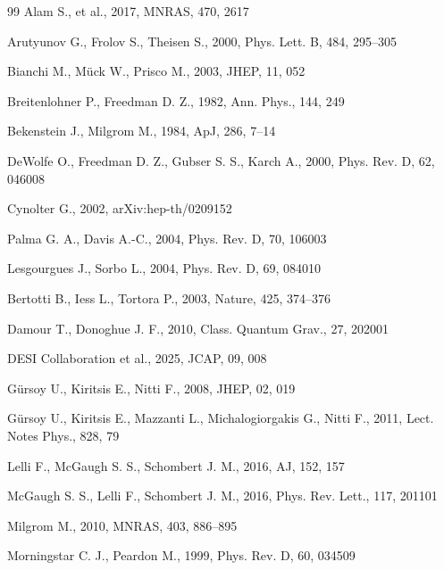 \documentclass[10pt]{article}
\begin{document}
\begin{thebibliography}{99}
Alam S., et al., 2017, MNRAS, 470, 2617

Arutyunov G., Frolov S., Theisen S., 2000, Phys. Lett. B, 484, 295--305

Bianchi M., M\"uck W., Prisco M., 2003, JHEP, 11, 052

Breitenlohner P., Freedman D. Z., 1982, Ann. Phys., 144, 249

Bekenstein J., Milgrom M., 1984, ApJ, 286, 7--14

DeWolfe O., Freedman D. Z., Gubser S. S., Karch A., 2000,
Phys. Rev. D, 62, 046008

Cynolter G., 2002, arXiv:hep-th/0209152

Palma G. A., Davis A.-C., 2004, Phys. Rev. D, 70, 106003

Lesgourgues J., Sorbo L., 2004, Phys. Rev. D, 69, 084010

Bertotti B., Iess L., Tortora P., 2003, Nature, 425, 374--376

Damour T., Donoghue J. F., 2010, Class. Quantum Grav., 27, 202001

DESI Collaboration et al., 2025, JCAP, 09, 008

Gürsoy U., Kiritsis E., Nitti F., 2008, JHEP, 02, 019

Gürsoy U., Kiritsis E., Mazzanti L., Michalogiorgakis G., Nitti F., 2011,
Lect. Notes Phys., 828, 79

Lelli F., McGaugh S. S., Schombert J. M., 2016, AJ, 152, 157

McGaugh S. S., Lelli F., Schombert J. M., 2016,
Phys. Rev. Lett., 117, 201101

Milgrom M., 2010, MNRAS, 403, 886--895

Morningstar C. J., Peardon M., 1999, Phys. Rev. D, 60, 034509


\end{thebibliography}
\end{document}
